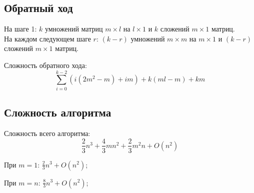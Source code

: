 \documentclass[12pt]{article}
\begin{document}
		\subsection{Обратный ход}
		На шаге 1: $k$ умножений матриц $m \times l$ на $l \times 1$ и $k$ сложений $m \times 1$ матриц. \\
		На каждом следующем шаге $r$: $(k - r)$ умножений $m \times m$ на $m \times 1$ и $(k - r)$ сложений $m \times 1$
		матриц.

		Сложность обратного хода:
		\[ \sum^{k-2}_{i=0} (i(2m^2-m) + im) + k(ml - m) + km \]

		\subsection{Сложность алгоритма}
		Сложность всего алгоритма: 
		\[\boxed{\frac{2}{3}n^3 + \frac{4}{3}mn^2 + \frac{2}{3}m^2n + O(n^2)} \]

		При $m = 1$: $\frac{2}{3}n^3 + O(n^2)$;

		При $m = n$: $\frac{8}{3}n^3 + O(n^2)$;
\end{document}
